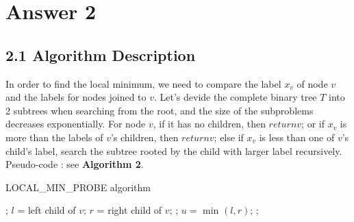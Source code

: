 \documentclass[UTF8]{ctexart}
\begin{document}
\section*{Answer 2}
\subsection*{2.1 Algorithm Description}
In order to find the local minimum, we need to compare the label $x_v$ of node $v$ and the labels for nodes joined to $v$.
Let's devide the complete binary tree $T$ into 2 subtrees when searching from the root, and the size of the subproblems decreases exponentially.
For  node $v$, if it has no children, then $ return v $; or if $x_v$ is more than the labels of $v$'s children, then $ return v $; else if $x_v$ is less than one of $v$'s child's label,
search the subtree rooted by the child with larger label recursively.\\

Pseudo-code : see \textbf{Algorithm 2}. 
\begin{algorithm}[h]
	\caption{LOCAL\_MIN\_PROBE algorithm}
	\begin{algorithmic}[1]
			\State {};
		\EndIf
		\State $ l $ = left child of $v $;
		\State $ r$ = right child of $v $;
			 ;
		\Else
			\State $u = $ min $(l, r)$; 
			\State {}; 
		\EndIf
	\EndFunction
	\end{algorithmic}
\end{algorithm}
\end{document}
